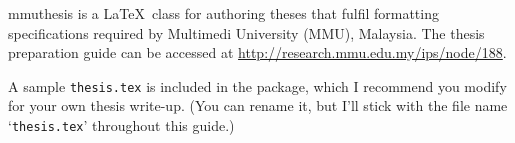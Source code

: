 \textsf{mmuthesis} is a \LaTeX\ class for authoring theses that fulfil formatting specifications required by Multimedi University (MMU), Malaysia. The thesis preparation guide can be accessed at \url{http://research.mmu.edu.my/ips/node/188}. 

A sample \texttt{thesis.tex} is included in the package, which I recommend you modify for your own thesis write-up. (You can rename it, but I'll stick with the file name `\texttt{thesis.tex}' throughout this guide.)
